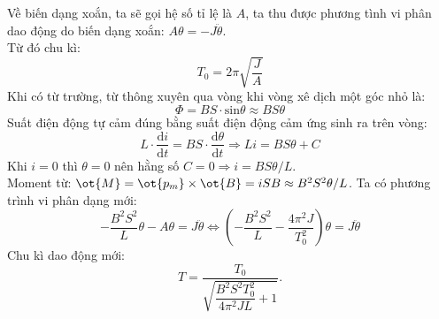 \begin{vd}
\begin{center}

\end{center}
\end{vd}
\begin{loigiai}
Về biến dạng xoắn, ta sẽ gọi hệ số tỉ lệ là $A$, ta thu được phương tình vi phân dao động do biến dạng xoắn: $A\theta=-J\ddot{\theta}$.\\
Từ đó chu kì:
$$T_0=2\pi\sqrt{\dfrac{J}{A}}$$
Khi có từ trường, từ thông xuyên qua vòng khi vòng xê dịch một góc nhỏ là:
$$\Phi=BS\cdot \mathrm{sin}\theta \approx BS\theta$$
Suất điện động tự cảm đúng bằng suất điện động cảm ứng sinh ra trên vòng:
$$L\cdot\dfrac{\mathrm{d}i}{\mathrm{d}t}=BS\cdot\dfrac{\mathrm{d}\theta}{\mathrm{d}t} \Rightarrow Li=BS\theta + C$$
Khi $i=0$ thì $\theta=0$ nên hằng số $C=0 \Rightarrow i=BS\theta/L$.\\
Moment từ: $\ot{M}=\ot{p_m}\times\ot{B}=iSB \approx B^2S^2\theta/L$.
Ta có phương trình vi phân dạng mới:
$$-\dfrac{B^2S^2}{L}\theta-A\theta=J\ddot{\theta}\Leftrightarrow \left(-\dfrac{B^2S^2}{L}-\dfrac{4\pi^2J}{T_0^2}\right)\theta=J\ddot{\theta}$$
Chu kì dao động mới:
$$T=\dfrac{T_0}{\sqrt{\dfrac{B^2S^2T_0^2}{4\pi^2JL}+1}}.$$
\end{loigiai}


